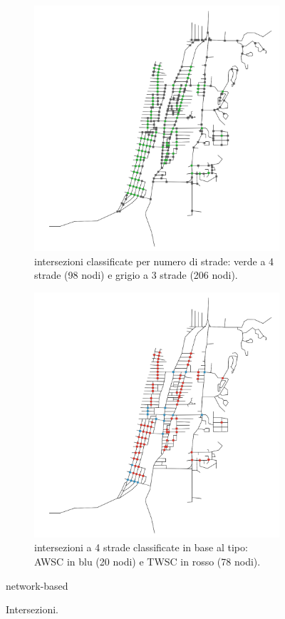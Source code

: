 \begin{figure}[ht]
    \centering
    \begin{subfigure}{0.475\textwidth}
        \includegraphics[width=\textwidth]{images/intersections}
        \caption{intersezioni classificate per numero di strade: verde a 4 strade (98 nodi) e grigio a 3 strade (206 nodi).}
        \label{fig:intersections}
    \end{subfigure}
    \hfill
    \begin{subfigure}{0.475\textwidth}
        \includegraphics[width=\textwidth]{images/int_type}
        \caption{intersezioni a 4 strade classificate in base al tipo: AWSC in blu (20 nodi) e TWSC in rosso (78 nodi).}
        \label{fig:intersections_types}
    \end{subfigure}network-based
    \caption{Intersezioni.}
    \label{fig:ints_map}
\end{figure}


